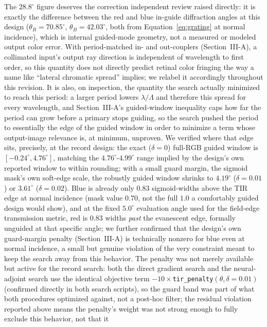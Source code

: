 \documentclass[10pt,twocolumn]{article}
\begin{document}
The $28.8^\circ$ figure deserves the correction independent review raised
directly: it is exactly the difference between the red and blue in-guide
diffraction angles at this design ($\theta_R=70.85^\circ$,
$\theta_B=42.03^\circ$, both from Equation~\eqref{eq:grating} at normal
incidence), which is internal guided-mode geometry, not a measured or
modeled output color error. With period-matched in- and out-couplers
(Section~III-A), a collimated input's output ray direction is independent
of wavelength to first order, so this quantity does not directly predict
retinal color fringing the way a name like ``lateral chromatic spread''
implies; we relabel it accordingly throughout this revision. It is also, on
inspection, the quantity the search actually minimized to reach this
period: a larger period lowers $\lambda/\Lambda$ and therefore this spread
for every wavelength, and Section~III-A's guided-window inequality caps how
far the period can grow before a primary stops guiding, so the search
pushed the period to essentially the edge of the guided window in order to
minimize a term whose output-image relevance is, at minimum, unproven. We
verified where that edge sits, precisely, at the record design: the exact
($\delta=0$) full-RGB guided window is $[-0.24^\circ, 4.76^\circ]$, matching
the $4.76^\circ$-$4.99^\circ$ range implied by the design's own reported
window to within rounding; with a small guard margin, the sigmoid mask's
own soft-edge scale, the robustly guided window shrinks to
$4.19^\circ$ ($\delta=0.01$) or $3.61^\circ$ ($\delta=0.02$). Blue is
already only $0.83$ sigmoid-widths above the TIR edge at normal incidence
(mask value $0.70$, not the full $1.0$ a comfortably guided design would
show), and at the fixed $5.0^\circ$ evaluation angle used for the
field-edge transmission metric, red is $0.83$ widths \emph{past} the
evanescent edge, formally unguided at that specific angle; we further
confirmed that the design's own guard-margin penalty (Section~III-A) is
technically nonzero for blue even at normal incidence, a small but genuine
violation of the very constraint meant to keep the search away from this
behavior. The penalty was not merely available but active for the record
search: both the direct gradient search and the neural-adjoint search use
the identical objective term $-10\times$\texttt{tir\_penalty}$(\theta,
\delta{=}0.01)$ (confirmed directly in both search scripts), so the guard
band was part of what both procedures optimized against, not a
post-hoc filter; the residual violation reported above means the penalty's
weight was not strong enough to fully exclude this behavior, not that it
\end{document}
